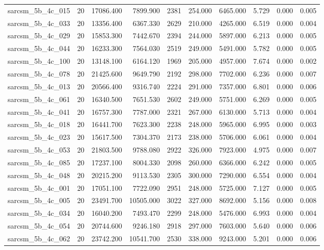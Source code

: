 \begin{tabular}{lrrrrrrrrr}
sarcsm\_5b\_4c\_015 & 20 & 17086.400 & 7899.900 & 2381 & 254.000 & 6465.000 & 5.729 & 0.000 & 0.005 \\
sarcsm\_5b\_4c\_033 & 20 & 13356.400 & 6367.330 & 2629 & 210.000 & 4265.000 & 6.519 & 0.000 & 0.004 \\
sarcsm\_5b\_4c\_029 & 20 & 15853.300 & 7442.670 & 2394 & 244.000 & 5897.000 & 6.213 & 0.000 & 0.005 \\
sarcsm\_5b\_4c\_044 & 20 & 16233.300 & 7564.030 & 2519 & 249.000 & 5491.000 & 5.782 & 0.000 & 0.005 \\
sarcsm\_5b\_4c\_100 & 20 & 13148.100 & 6164.120 & 1969 & 205.000 & 4957.000 & 7.674 & 0.000 & 0.002 \\
sarcsm\_5b\_4c\_078 & 20 & 21425.600 & 9649.790 & 2192 & 298.000 & 7702.000 & 6.236 & 0.000 & 0.007 \\
sarcsm\_5b\_4c\_013 & 20 & 20566.400 & 9316.740 & 2224 & 291.000 & 7357.000 & 6.801 & 0.000 & 0.006 \\
sarcsm\_5b\_4c\_061 & 20 & 16340.500 & 7651.530 & 2602 & 249.000 & 5751.000 & 6.269 & 0.000 & 0.005 \\
sarcsm\_5b\_4c\_041 & 20 & 16757.300 & 7787.000 & 2321 & 267.000 & 6130.000 & 5.713 & 0.000 & 0.004 \\
sarcsm\_5b\_4c\_018 & 20 & 16441.700 & 7623.300 & 2238 & 248.000 & 5965.000 & 6.995 & 0.000 & 0.003 \\
sarcsm\_5b\_4c\_023 & 20 & 15617.500 & 7304.370 & 2173 & 238.000 & 5706.000 & 6.061 & 0.000 & 0.004 \\
sarcsm\_5b\_4c\_053 & 20 & 21803.500 & 9788.080 & 2922 & 326.000 & 7923.000 & 4.975 & 0.000 & 0.007 \\
sarcsm\_5b\_4c\_085 & 20 & 17237.100 & 8004.330 & 2098 & 260.000 & 6366.000 & 6.242 & 0.000 & 0.005 \\
sarcsm\_5b\_4c\_048 & 20 & 20215.200 & 9113.530 & 2305 & 300.000 & 7290.000 & 6.554 & 0.000 & 0.004 \\
sarcsm\_5b\_4c\_001 & 20 & 17051.100 & 7722.090 & 2951 & 248.000 & 5725.000 & 7.127 & 0.000 & 0.005 \\
sarcsm\_5b\_4c\_005 & 20 & 23491.700 & 10505.000 & 3022 & 327.000 & 8692.000 & 5.156 & 0.000 & 0.008 \\
sarcsm\_5b\_4c\_034 & 20 & 16040.200 & 7493.470 & 2299 & 248.000 & 5476.000 & 6.993 & 0.000 & 0.004 \\
sarcsm\_5b\_4c\_054 & 20 & 20744.600 & 9246.180 & 2918 & 297.000 & 7603.000 & 5.640 & 0.000 & 0.006 \\
sarcsm\_5b\_4c\_062 & 20 & 23742.200 & 10541.700 & 2530 & 338.000 & 9243.000 & 5.201 & 0.000 & 0.006 \\

\end{tabular}
